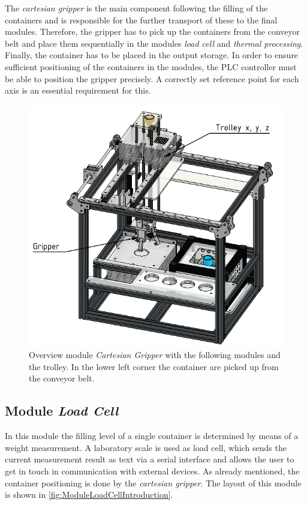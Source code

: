 	    The \textit{cartesian gripper} is the main component following the filling of the containers and is responsible for the further transport of these to the final modules. Therefore, the gripper has to pick up the containers from the conveyor belt and place them sequentially in the modules \textit{load cell} and \textit{thermal processing}. Finally, the container has to be placed in the output storage. In order to ensure sufficient positioning of the containers in the modules, the PLC controller must be able to position the gripper precisely. A correctly set reference point for each axis is an essential requirement for this.
        	\begin{figure}[htp]
    		\centering
            \includegraphics{figures/CadGripper.pdf}
    		\caption[Overview module \textit{Cartesian Gripper}.]{Overview module \textit{Cartesian Gripper} with the following modules and the trolley. In the lower left corner the container are picked up from the conveyor belt.}
    		\label{fig:ModuleGripperIntroduction}
    	\end{figure}
    
	
	\subsection{Module \textit{Load Cell}}
	    In this module the filling level of a single container is determined by means of a weight measurement. A laboratory scale is used as load cell, which sends the current measurement result as text via a serial interface and allows the user to get in touch in communication with external devices. As already mentioned, the container positioning is done by the \textit{cartesian gripper}. The layout of this module is shown in \autoref{fig:ModuleLoadCellIntroduction}.\\
	    

